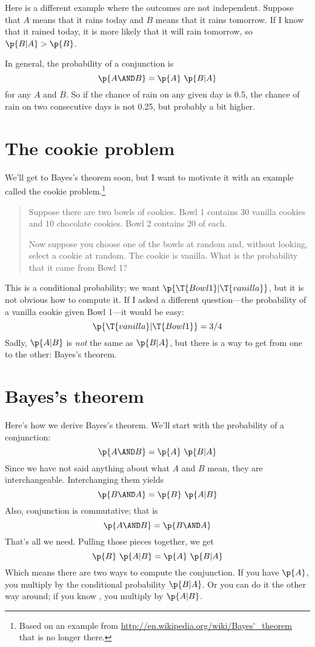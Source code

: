 \documentclass[12pt]{book}
\theoremstyle{exercise}
\begin{document}
Here is a different example where the outcomes are not independent.
Suppose that $A$ means that it rains today and $B$ means that it
rains tomorrow.  If I know that it rained today, it is more likely
that it will rain tomorrow, so $\p{B|A} > \p{B}$.

In general, the probability of a conjunction is
%
\[ \p{A \AND B} = \p{A}~\p{B|A} \]
%
for any $A$ and $B$.  So if the chance of rain on any given day
is 0.5, the chance of rain on two consecutive days is not
0.25, but probably a bit higher.


\section{The cookie problem}
\label{cookie}


We'll get to Bayes's theorem soon, but I want to motivate it with an
example called the cookie problem.\footnote{Based on an example from
  \url{http://en.wikipedia.org/wiki/Bayes'_theorem} that is no longer
  there.}

\begin{quote}
Suppose there are two bowls of cookies.
Bowl 1 contains 30 vanilla cookies and 10 chocolate cookies.
Bowl 2 contains 20 of each.

Now suppose you choose one of the bowls at random and, without
looking, select a cookie at random.
The cookie is vanilla.
What is the probability that it came from Bowl 1?
\end{quote}

This is a conditional probability; we want $\p{\T{Bowl 1} |
  \T{vanilla}}$, but it is not obvious how to compute it.  If I asked a
different question---the probability of a vanilla cookie given Bowl
1---it would be easy:
%
\[ \p{\T{vanilla} | \T{Bowl 1}} = 3/4 \]
%
Sadly, $\p{A|B}$ is {\em not} the same as $\p{B|A}$, but there
is a way to get from one to the other: Bayes's theorem.


\section{Bayes's theorem}


Here's how we derive Bayes's theorem.
We'll start with the probability of a conjunction:
%
\[ \p{A \AND B} = \p{A}~\p{B|A} \]
%
Since we have not said anything about what $A$ and $B$ mean, they
are interchangeable.
Interchanging them yields
%
\[ \p{B \AND A} = \p{B}~\p{A|B} \]
%
Also, conjunction is commutative; that is
%
\[ \p{A \AND B} = \p{B \AND A} \]
%
That's all we need.  Pulling those pieces together, we get
%
\[ \p{B}~\p{A|B} = \p{A}~\p{B|A} \]
%
Which means there are two ways to compute the conjunction.
If you have $\p{A}$, you multiply by the conditional
probability $\p{B|A}$.
Or you can do it the other way around; if you
know , you multiply by $\p{A|B}$.
\end{document}
